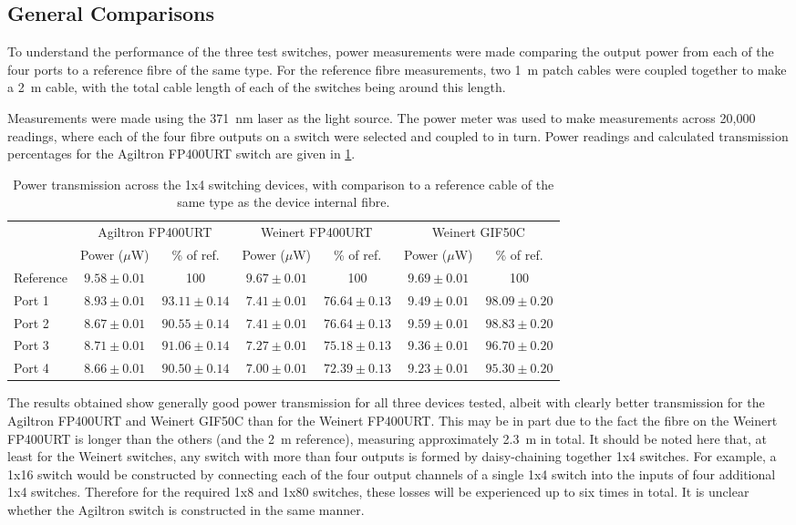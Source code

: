 \documentclass[a4paper,11pt]{article}
\begin{document}
\subsection{General Comparisons}

To understand the performance of the three test switches, power measurements were made comparing the output power from each of the four ports to a reference fibre of the same type. For the reference fibre measurements, two 1~m patch cables were coupled together to make a 2~m cable, with the total cable length of each of the switches being around this length.

Measurements were made using the 371~nm laser as the light source. The power meter was used to make measurements across 20,000 readings, where each of the four fibre outputs on a switch were selected and coupled to in turn. Power readings and calculated transmission percentages for the Agiltron FP400URT switch are given in \cref{tab:switchpower}.
\begin{table}[h]
\centering
\begin{tabular}{l|cc|cc|cc}
\toprule
\multirow{2}{*}{} & \multicolumn{2}{c|}{Agiltron FP400URT} & \multicolumn{2}{c|}{Weinert FP400URT} & \multicolumn{2}{c}{Weinert GIF50C} \\
			&	Power ($\mu$W) & \% of ref. & Power ($\mu$W) & \% of ref. & Power ($\mu$W) & \% of ref.\\ \midrule
Reference	& $9.58\pm0.01$	& 100  			 & $9.67\pm0.01$ & 100 			  & $9.69\pm0.01$ & 100 \\
Port 1		& $8.93\pm0.01$	& $93.11\pm0.14$ & $7.41\pm0.01$ & $76.64\pm0.13$ & $9.49\pm0.01$ & $98.09\pm0.20$ \\
Port 2		& $8.67\pm0.01$	& $90.55\pm0.14$ & $7.41\pm0.01$ & $76.64\pm0.13$ & $9.59\pm0.01$ & $98.83\pm0.20$ \\
Port 3		& $8.71\pm0.01$	& $91.06\pm0.14$ & $7.27\pm0.01$ & $75.18\pm0.13$ & $9.36\pm0.01$ & $96.70\pm0.20$ \\
Port 4		& $8.66\pm0.01$	& $90.50\pm0.14$ & $7.00\pm0.01$ & $72.39\pm0.13$ & $9.23\pm0.01$ & $95.30\pm0.20$ \\
\bottomrule
\end{tabular}
\caption{Power transmission across the 1x4 switching devices, with comparison to a reference cable of the same type as the device internal fibre.}\label{tab:switchpower}
\end{table}
The results obtained show generally good power transmission for all three devices tested, albeit with clearly better transmission for the Agiltron FP400URT and Weinert GIF50C than for the Weinert FP400URT. This may be in part due to the fact the fibre on the Weinert FP400URT is longer than the others (and the 2~m reference), measuring approximately 2.3~m in total. It should be noted here that, at least for the Weinert switches, any switch with more than four outputs is formed by daisy-chaining together 1x4 switches. For example, a 1x16 switch would be constructed by connecting each of the four output channels of a single 1x4 switch into the inputs of four additional 1x4 switches. Therefore for the required 1x8 and 1x80 switches, these losses will be experienced up to six times in total. It is unclear whether the Agiltron switch is constructed in the same manner.
\end{document}
